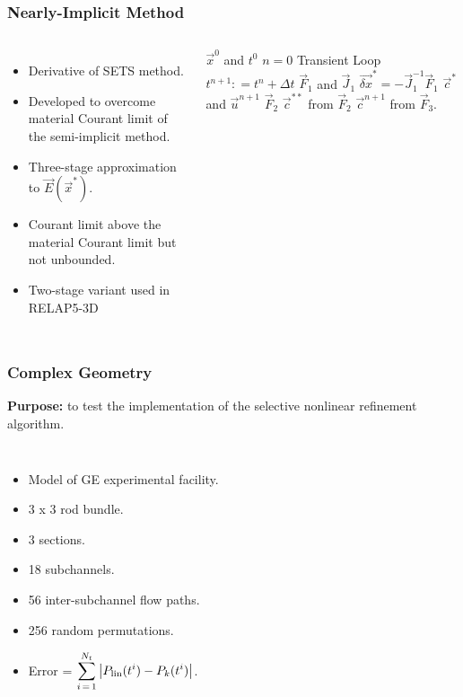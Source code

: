 \documentclass[compress,xcolor=table]{beamer}
\begin{document}
\begin{frame}[shrink=5] 
\frametitle{Nearly-Implicit Method}

\begin{columns}

\begin{itemize}
\item{Derivative of SETS method.}
\item{Developed to overcome material Courant limit of the semi-implicit method.}
\item{Three-stage approximation to $\vec{E}(\vec{x}^{*})$.}
\item{Courant limit above the material Courant limit but not unbounded.}
\item{Two-stage variant used in RELAP5-3D}
\end{itemize}

\begin{algorithmic}
\scriptsize
\Require $\vec{x}^{0}$ and $t^{0}$
\Set $n = 0$
\Loop \; Transient Loop
    \State $t^{n+1} : = t^{n} + \Delta t$
	\Calculate $\vec{F}_1$ and $\vec{J}_1$
	\Calculate $\vec{\delta x}^{*} = -\vec{J}^{-1}_1\vec{F}_1$
	\Calculate $\vec{c}^{*}$ and $\vec{u}^{n+1}$
	\Calculate $\vec{F}_2$
	\Calculate $\vec{c}^{**}$ from $\vec{F}_2$
	\Calculate $\vec{c}^{n+1}$ from $\vec{F}_3$.
\end{algorithmic}

\end{columns}

\end{frame}
\begin{frame} 
\frametitle{Complex Geometry}

\textbf{Purpose:} to test the implementation of the selective nonlinear refinement algorithm.

\begin{columns}

\begin{itemize}
\item{Model of GE experimental facility.}
\item{3 x 3 rod bundle.}
\item{3 sections.}
\item{18 subchannels.}
\item{56 inter-subchannel flow paths.}
\item{256 random permutations.}
\item{Error = $\displaystyle \sum_{i\,=\,1}^{N_{t}} \left|P_{\text{lin}}(t^{i}) -P_{k}(t^{i})\right|$.}
\end{itemize}


\begin{figure}[h!t]
\centering
\resizebox{\textwidth}{!}{

}
\end{figure}

\end{columns}
\end{frame}
\end{document}
